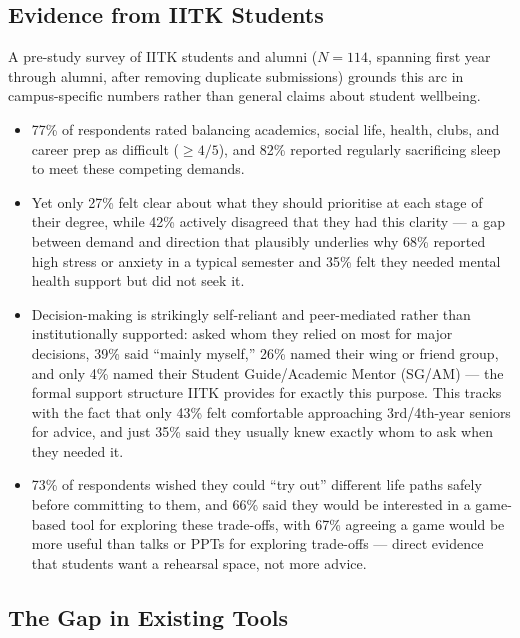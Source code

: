 \subsection*{Evidence from IITK Students}
\label{sec:evidence}

A pre-study survey of IITK students and alumni ($N = 114$, spanning first year through alumni, after removing duplicate submissions) grounds this arc in campus-specific numbers rather than general claims about student wellbeing.

\begin{itemize}
  \setlength\itemsep{0.4em}
  \item 77\% of respondents rated balancing academics, social life, health, clubs, and career prep as difficult ($\geq 4/5$), and 82\% reported regularly sacrificing sleep to meet these competing demands.

  \item Yet only 27\% felt clear about what they should prioritise at each stage of their degree, while 42\% actively disagreed that they had this clarity --- a gap between demand and direction that plausibly underlies why 68\% reported high stress or anxiety in a typical semester and 35\% felt they needed mental health support but did not seek it.

  \item Decision-making is strikingly self-reliant and peer-mediated rather than institutionally supported: asked whom they relied on most for major decisions, 39\% said ``mainly myself,'' 26\% named their wing or friend group, and only 4\% named their Student Guide/Academic Mentor (SG/AM) --- the formal support structure IITK provides for exactly this purpose. This tracks with the fact that only 43\% felt comfortable approaching 3rd/4th-year seniors for advice, and just 35\% said they usually knew exactly whom to ask when they needed it.

  \item 73\% of respondents wished they could ``try out'' different life paths safely before committing to them, and 66\% said they would be interested in a game-based tool for exploring these trade-offs, with 67\% agreeing a game would be more useful than talks or PPTs for exploring trade-offs --- direct evidence that students want a rehearsal space, not more advice.
\end{itemize}

\subsection*{The Gap in Existing Tools}
\label{sec:gap}

